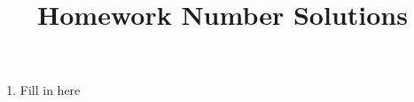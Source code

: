 \documentclass[12pt]{article}
\begin{document}
\begin{enumerate}

\title{Homework Number Solutions}

\item Fill in here

\end{enumerate}
\end{document}
